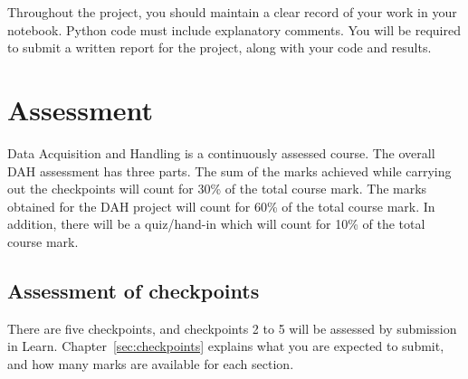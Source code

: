 
Throughout the project, you should maintain a clear record of your work in your notebook.
Python code must include explanatory comments.
You will be required to submit a written report for the project, along with your code and results.

\newpage
\section{Assessment} 

Data Acquisition and Handling is a continuously assessed course.
The overall DAH assessment has three parts.
The sum of the marks achieved while carrying out the checkpoints will count for 30\% of the total course mark.
The marks obtained for the DAH project will count for 60\% of the total course mark.
In addition, there will be a quiz/hand-in which will count for 10\% of the total course mark.

\subsection{Assessment of checkpoints}

There are five checkpoints, and checkpoints 2 to 5 will be assessed by submission in Learn.
Chapter~\ref{sec:checkpoints} explains what you are expected to submit, and how many marks are available for each section.

